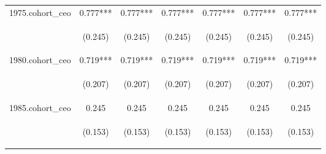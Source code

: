 \begin{center}
\begin{tabular}{lcccccc}
1975.cohort\_ceo & 0.777*** & 0.777*** & 0.777*** & 0.777*** & 0.777*** & 0.777*** \\
\vspace{4pt} & \begin{footnotesize}(0.245)\end{footnotesize} & \begin{footnotesize}(0.245)\end{footnotesize} & \begin{footnotesize}(0.245)\end{footnotesize} & \begin{footnotesize}(0.245)\end{footnotesize} & \begin{footnotesize}(0.245)\end{footnotesize} & \begin{footnotesize}(0.245)\end{footnotesize} \\
1980.cohort\_ceo & 0.719*** & 0.719*** & 0.719*** & 0.719*** & 0.719*** & 0.719*** \\
\vspace{4pt} & \begin{footnotesize}(0.207)\end{footnotesize} & \begin{footnotesize}(0.207)\end{footnotesize} & \begin{footnotesize}(0.207)\end{footnotesize} & \begin{footnotesize}(0.207)\end{footnotesize} & \begin{footnotesize}(0.207)\end{footnotesize} & \begin{footnotesize}(0.207)\end{footnotesize} \\
1985.cohort\_ceo & 0.245 & 0.245 & 0.245 & 0.245 & 0.245 & 0.245 \\
\vspace{4pt} & \begin{footnotesize}(0.153)\end{footnotesize} & \begin{footnotesize}(0.153)\end{footnotesize} & \begin{footnotesize}(0.153)\end{footnotesize} & \begin{footnotesize}(0.153)\end{footnotesize} & \begin{footnotesize}(0.153)\end{footnotesize} & \begin{footnotesize}(0.153)\end{footnotesize} \\

\end{tabular}
\end{center}
